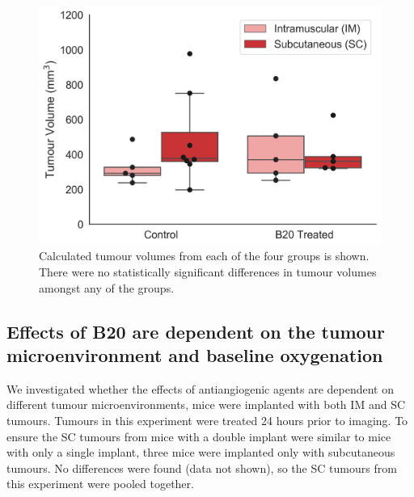\begin{figure}[htbp]
   \centering
   \includegraphics[width=\textwidth]{oemri_thesis3/oemri_thesis3-images/6_oep8_tumourVolumes.png} %
   \caption{Calculated tumour volumes from each of the four groups is shown. There were no statistically significant differences in tumour volumes amongst any of the groups.}
   \label{tumourVolumes}
\end{figure}


\subsection{Effects of B20 are dependent on the tumour microenvironment and baseline oxygenation}

We investigated whether the effects of antiangiogenic agents are dependent on different tumour microenvironments, mice were implanted with both \acs{IM} and \acs{SC} tumours. 
Tumours in this experiment were treated 24 hours prior to imaging.
To ensure the \acs{SC} tumours from mice with a double implant were similar to mice with only a single implant, three mice were implanted only with subcutaneous tumours.
No differences were found (data not shown), so the \acs{SC} tumours from this experiment were pooled together.

